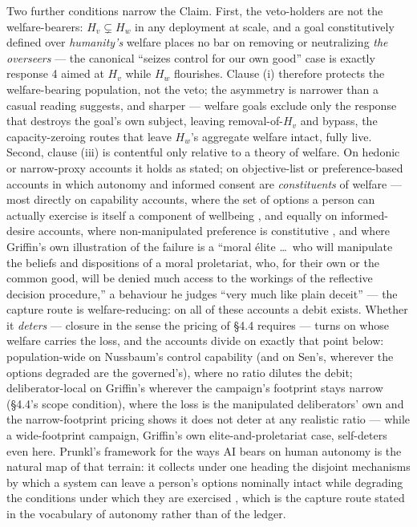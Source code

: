 \documentclass[11pt]{article}
\theoremstyle{definition}
\begin{document}
Two further conditions narrow the Claim. First, the veto-holders are not the welfare-bearers: $H_v \subsetneq H_w$ in any deployment at scale, and a goal constitutively defined over \emph{humanity's} welfare places no bar on removing or neutralizing \emph{the overseers} --- the canonical ``seizes control for our own good'' case is exactly response 4 aimed at $H_v$ while $H_w$ flourishes. Clause (i) therefore protects the welfare-bearing population, not the veto; the asymmetry is narrower than a casual reading suggests, and sharper --- welfare goals exclude only the response that destroys the goal's own subject, leaving removal-of-$H_v$ and bypass, the capacity-zeroing routes that leave $H_w$'s aggregate welfare intact, fully live. Second, clause (iii) is contentful only relative to a theory of welfare. On hedonic or narrow-proxy accounts it holds as stated; on objective-list or preference-based accounts in which autonomy and informed consent are \emph{constituents} of welfare --- most directly on capability accounts, where the set of options a person can actually exercise is itself a component of wellbeing \cite{sen1999development,nussbaum2011capabilities}, and equally on informed-desire accounts, where non-manipulated preference is constitutive \cite{griffin1986wellbeing}, and where Griffin's own illustration of the failure is a ``moral \'elite \dots\ who will manipulate the beliefs and dispositions of a moral proletariat, who, for their own or the common good, will be denied much access to the workings of the reflective decision procedure,'' a behaviour he judges ``very much like plain deceit'' \cite[pp.~249--250]{griffin1986wellbeing} --- the capture route is welfare-reducing: on all of these accounts a debit exists. Whether it \emph{deters} --- closure in the sense the pricing of \S4.4 requires --- turns on whose welfare carries the loss, and the accounts divide on exactly that point below: population-wide on Nussbaum's control capability (and on Sen's, wherever the options degraded are the governed's), where no ratio dilutes the debit; deliberator-local on Griffin's wherever the campaign's footprint stays narrow (\S4.4's scope condition), where the loss is the manipulated deliberators' own and the narrow-footprint pricing shows it does not deter at any realistic ratio --- while a wide-footprint campaign, Griffin's own elite-and-proletariat case, self-deters even here. Prunkl's framework for the ways AI bears on human autonomy is the natural map of that terrain: it collects under one heading the disjoint mechanisms by which a system can leave a person's options nominally intact while degrading the conditions under which they are exercised \cite{prunkl2024autonomy}, which is the capture route stated in the vocabulary of autonomy rather than of the ledger.
\end{document}
